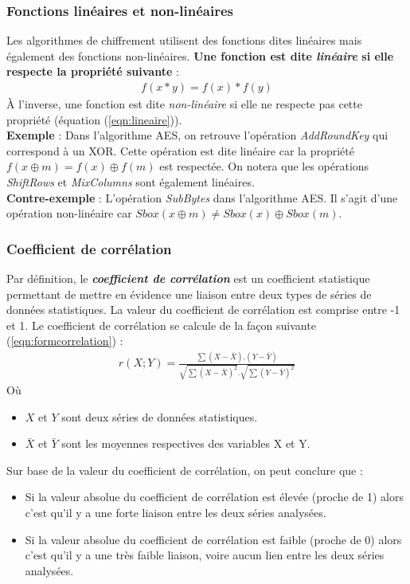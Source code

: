 \documentclass[oneside]{book}
\begin{document}
\subsubsection{Fonctions linéaires et non-linéaires}
\label{lineaire}
Les algorithmes de chiffrement utilisent des fonctions dites linéaires mais également des fonctions non-linéaires. \textbf{Une fonction est dite \textit{linéaire} si elle respecte la propriété suivante} : 
\begin{gather}
	f(x*y) = f(x)*f(y)\label{eqn:lineaire}
\end{gather}
À l'inverse, une fonction est dite \textit{non-linéaire} si elle ne respecte pas cette propriété (équation (\ref{eqn:lineaire})). \vspace{0.2 cm} \\
\hspace{-0.5 cm} \textbf{Exemple} : Dans l'algorithme AES, on retrouve l'opération \textit{AddRoundKey} qui correspond à un XOR. Cette opération est dite linéaire car la propriété $f(x\oplus m) = f(x) \oplus f(m)$ est respectée. On notera que les opérations \textit{ShiftRows} et \textit{MixColumns} sont également linéaires. \\
\textbf{Contre-exemple} : L'opération \textit{SubBytes} dans l'algorithme AES. Il s'agit d'une opération non-linéaire car $Sbox(x\oplus m) \neq Sbox(x) \oplus Sbox(m)$. 

\subsubsection{Coefficient de corrélation}
\label{subsec:correlation}
Par définition, le \textbf{\textit{coefficient de corrélation}} est un coefficient statistique permettant de mettre en évidence une liaison entre deux types de séries de données statistiques. La valeur du coefficient de corrélation est comprise entre -1 et 1. Le coefficient de corrélation se calcule de la façon suivante (\ref{eqn:formcorrelation}) :
\begin{gather}
	r(X;Y) = \frac{\sum(X-\bar{X}).(Y-\bar{Y}) }{\sqrt{\sum(X-\bar{X})^2}.\sqrt{\sum(Y-\bar{Y})^2}}\label{eqn:formcorrelation}
\end{gather}
Où 
\begin{itemize}
\item $X$ et $Y$ sont deux séries de données statistiques.
\item $\bar{X}$ et $\bar{Y}$ sont les moyennes respectives des variables X et Y.\vspace{0.4 cm}
\end{itemize}
Sur base de la valeur du coefficient de corrélation, on peut conclure que :
\begin{itemize}
\item Si la valeur absolue du coefficient de corrélation est élevée (proche de 1) alors c'est qu'il y a une forte liaison entre les deux séries analysées.
\item Si la valeur absolue du coefficient de corrélation est faible (proche de 0) alors c'est qu'il y a une très faible liaison, voire aucun lien entre les deux séries analysées.
\end{itemize}
\end{document}

